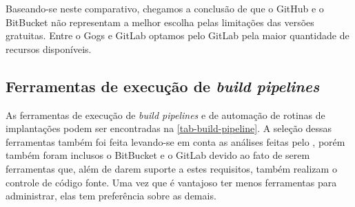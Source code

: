 \documentclass[
	12pt,				%
	openright,			%
	twoside,			%
	a4paper,			%
	english,			%
	french,				%
	spanish,			%
	brazil,				%
	]{abntex2}
\begin{document}
Baseando-se neste comparativo, chegamos a conclusão de que o GitHub e o BitBucket não representam a melhor escolha pelas limitações das versões gratuitas. Entre o Gogs e GitLab optamos pelo GitLab pela maior quantidade de recursos disponíveis.

\subsection{Ferramentas de execução de \textit{build pipelines}}

As ferramentas de execução de \textit{build pipelines} e de automação de rotinas de implantações podem ser encontradas na \autoref{tab-build-pipeline}. A seleção dessas ferramentas também foi feita levando-se em conta as análises feitas pelo , porém também foram inclusos o BitBucket e o GitLab devido ao fato de serem ferramentas que, além de darem suporte a estes requisitos, também realizam o controle de código fonte. Uma vez que é vantajoso ter menos ferramentas para administrar, elas tem preferência sobre as demais.
\end{document}
